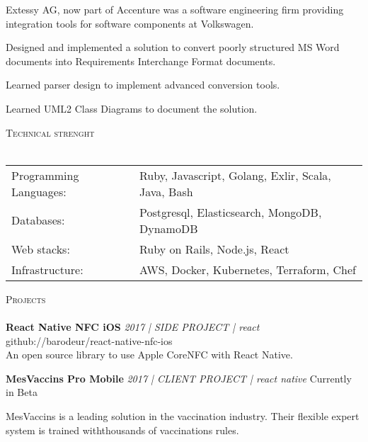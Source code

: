 \documentclass[a4paper]{article}
\newcommand{\lineunder} {
    \vspace*{-8pt} \\
    \hspace*{-18pt} \hrulefill \\
}
\newcommand{\header} [1] {
    {\hspace*{-18pt}\vspace*{6pt} \textsc{#1}}
    \vspace*{-6pt} \lineunder
}
\begin{document}
\begin{itshape}
Extessy AG, now part of Accenture was a software engineering firm providing integration tools for software components at Volkswagen.
\end{itshape}

Designed and implemented a solution to convert poorly structured MS Word documents into Requirements Interchange Format documents.

Learned parser design to implement advanced conversion tools.

Learned UML2 Class Diagrams to document the solution.

\vspace{2mm}

\header{Technical strenght}
\begin{tabular}{ l l }
    Programming Languages:  & Ruby, Javascript, Golang, Exlir, Scala, Java, Bash   \\
    Databases:              & Postgresql, Elasticsearch, MongoDB, DynamoDB  \\
    Web stacks:             & Ruby on Rails, Node.js, React                        \\
    Infrastructure:         & AWS, Docker, Kubernetes, Terraform, Chef             \\
\end{tabular}

\header{Projects}
{\textbf{React Native NFC iOS} \sl 2017 | SIDE PROJECT | react} \hfill github://barodeur/react-native-nfc-ios\\
An open source library to use Apple CoreNFC with React Native.\\
\vspace*{2mm}


{\textbf{MesVaccins Pro Mobile} \sl 2017 | CLIENT PROJECT | react native} \hfill Currently in Beta\\
\begin{itshape}
MesVaccins is a leading solution in the vaccination industry.
Their flexible expert system is trained withthousands of vaccinations rules.
\end{itshape}
\end{document}
